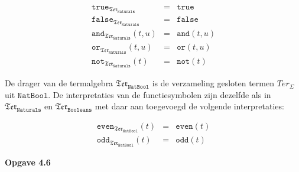 \documentclass[a4paper,11pt]{article}
\begin{document}
\begin{eqnarray*}
  \texttt{true}_{\mathfrak{Ter}_{\texttt{Naturals}}}     & = & \texttt{true} \\
  \texttt{false}_{\mathfrak{Ter}_{\texttt{Naturals}}}    & = & \texttt{false} \\
  \texttt{and}_{\mathfrak{Ter}_{\texttt{Naturals}}}(t,u) & = & \texttt{and}(t,u) \\
  \texttt{or}_{\mathfrak{Ter}_{\texttt{Naturals}}}(t,u)  & = & \texttt{or}(t,u) \\
  \texttt{not}_{\mathfrak{Ter}_{\texttt{Naturals}}}(t)   & = & \texttt{not}(t)
\end{eqnarray*}

De drager van de termalgebra $\mathfrak{Ter}_{\texttt{NatBool}}$ is de
verzameling gesloten termen $Ter_{\Sigma}$ uit $\texttt{NatBool}$. De
interpretaties van de functiesymbolen zijn dezelfde als in
$\mathfrak{Ter}_{\texttt{Naturals}}$ en $\mathfrak{Ter}_{\texttt{Booleans}}$
met daar aan toegevoegd de volgende interpretaties:

\begin{eqnarray*}
  \texttt{even}_{\mathfrak{Ter}_{\texttt{NatBool}}}(t)   & = & \texttt{even}(t) \\
  \texttt{odd}_{\mathfrak{Ter}_{\texttt{NatBool}}}(t)   & = & \texttt{odd}(t)
\end{eqnarray*}


{\bf Opgave 4.6}
\end{document}
